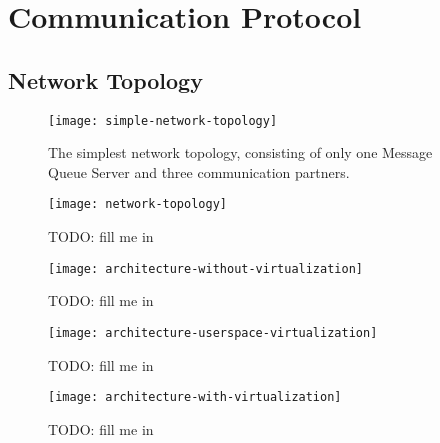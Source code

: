 \chapter{Communication Protocol}
\label{cha:comm-prot}

\section{Network Topology}
\label{sec:network-topology}

\begin{figure}
  \begin{center}
    \texttt{[image: simple-network-topology]}
  \end{center}
  \caption[Network  Topology   (simple)]{The  simplest  network  topology,
    consisting of  only one Message  Queue Server and  three communication
    partners.}
  \label{fig:simple-net-top}
\end{figure}

\begin{figure}
  \begin{center}
    \texttt{[image: network-topology]}
  \end{center}
  \caption[Network  Topology]{TODO: fill me in}
  \label{fig:net-top}
\end{figure}

\begin{figure}
  \begin{center}
    \texttt{[image: architecture-without-virtualization]}
  \end{center}
  \caption[No virtualization]{TODO: fill me in}
  \label{fig:arch-novirt}
\end{figure}

\begin{figure}
  \begin{center}
    \texttt{[image: architecture-userspace-virtualization]}
  \end{center}
  \caption[Virtualization in the user-space]{TODO: fill me in}
  \label{fig:arch-userspace-virt}
\end{figure}

\begin{figure}
  \begin{center}
    \texttt{[image: architecture-with-virtualization]}
  \end{center}
  \caption[Virtualization architecture]{TODO: fill me in}
  \label{fig:arch-virt}
\end{figure}


